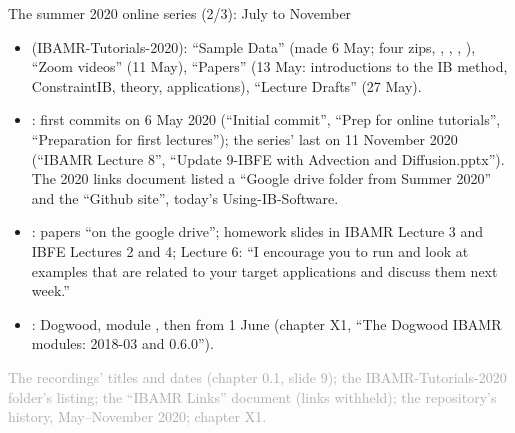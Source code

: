 \documentclass[aspectratio=169,11pt]{beamer}
\newcommand{\sourcecredit}[1]{\vfill\begin{flushright}\tiny\textcolor{DarkGray}{#1}\end{flushright}}
\begin{document}
\begin{frame}{The summer 2020 online series (2/3): July to November}
\vspace{1.5mm}
\scriptsize
\begin{itemize}\setlength{\itemsep}{1.5pt}
  \item {} (IBAMR-Tutorials-2020): ``Sample Data'' (made 6 May; four zips, , , , ), ``Zoom videos'' (11 May), ``Papers'' (13 May: introductions to the IB method, ConstraintIB, theory, applications), ``Lecture Drafts'' (27 May).
  \item {}: first commits on 6 May 2020 (``Initial commit'', ``Prep for online tutorials'', ``Preparation for first lectures''); the series' last on 11 November 2020 (``IBAMR Lecture 8'', ``Update 9-IBFE with Advection and Diffusion.pptx''). The 2020 links document listed a ``Google drive folder from Summer 2020'' and the ``Github site'', today's Using-IB-Software.
  \item {}: papers ``on the google drive''; homework slides in IBAMR Lecture 3 and IBFE Lectures 2 and 4; Lecture 6: ``I encourage you to run and look at examples that are related to your target applications and discuss them next week.''
  \item {}: Dogwood, module , then  from 1 June (chapter X1, ``The Dogwood IBAMR modules: 2018-03 and 0.6.0'').
\end{itemize}
\sourcecredit{The recordings' titles and dates (chapter 0.1, slide 9); the IBAMR-Tutorials-2020 folder's listing; the ``IBAMR Links'' document (links withheld); the repository's history, May--November 2020; chapter X1.}
\end{frame}
\end{document}

